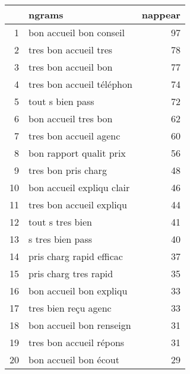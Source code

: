 \begin{tabular}{|r|l|r|}
  \hline
 & ngrams & nappear \\ 
  \hline
1 & bon accueil bon conseil &  97 \\ 
  2 & tres bon accueil tres &  78 \\ 
  3 & tres bon accueil bon &  77 \\ 
  4 & tres bon accueil téléphon &  74 \\ 
  5 & tout s bien pass &  72 \\ 
  6 & bon accueil tres bon &  62 \\ 
  7 & tres bon accueil agenc &  60 \\ 
  8 & bon rapport qualit prix &  56 \\ 
  9 & tres bon pris charg &  48 \\ 
  10 & bon accueil expliqu clair &  46 \\ 
  11 & tres bon accueil expliqu &  44 \\ 
  12 & tout s tres bien &  41 \\ 
  13 & s tres bien pass &  40 \\ 
  14 & pris charg rapid efficac &  37 \\ 
  15 & pris charg tres rapid &  35 \\ 
  16 & bon accueil bon expliqu &  33 \\ 
  17 & tres bien reçu agenc &  33 \\ 
  18 & bon accueil bon renseign &  31 \\ 
  19 & tres bon accueil répons &  31 \\ 
  20 & bon accueil bon écout &  29 \\ 
   \hline
\end{tabular}
